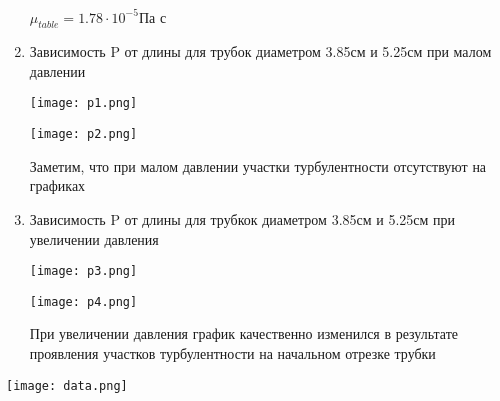 \documentclass{article}
\begin{document}
\begin{enumerate}
    $\mu_{table} = 1.78 \cdot 10^{-5} \text{Па с}$
     
     
    \item Зависимость P от длины для трубок диаметром 3.85см и 5.25см при малом давлении
        \begin{center}
        \texttt{[image: p1.png]}
        \end{center}
        

        \begin{center}
        \texttt{[image: p2.png]}
        \end{center}
        
        Заметим, что при малом давлении участки турбулентности отсутствуют на графиках
    
    
    \item Зависимость P от длины для трубкок диаметром 3.85см и 5.25см при увеличении давления
        \begin{center}
        \texttt{[image: p3.png]}
        \end{center}
        
        \begin{center}
        \texttt{[image: p4.png]}
        \end{center}
        
        При увеличении давления график качественно изменился в результате проявления участков турбулентности на начальном отрезке трубки    
\end{enumerate}

 \pagebreak
    \begin{center}
    \texttt{[image: data.png]}
    \end{center}
        
        
\end{document}
